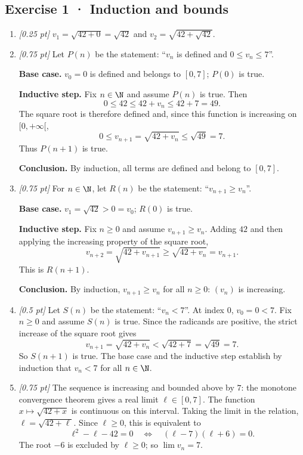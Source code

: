\subsection*{Exercise 1 · Induction and bounds}\begin{enumerate}

\item \textit{[0.25 pt]} $v_1=\sqrt{42+0}=\sqrt{42}$ and $v_2=\sqrt{42+\sqrt{42}}$.

\item \textit{[0.75 pt]} Let $P(n)$ be the statement: ``$v_n$ is defined and $0\le v_n\le 7$''.
\par\smallskip\textbf{Base case.} $v_0=0$ is defined and belongs to $[0,7]$; $P(0)$ is true.
\par\smallskip\textbf{Inductive step.} Fix $n\in\N$ and assume $P(n)$ is true. Then
\[0\le 42\le 42+v_n\le 42+7=49.\]
The square root is therefore defined and, since this function is increasing on $[0,+\infty[$,
\[0\le v_{n+1}=\sqrt{42+v_n}\le\sqrt{49}=7.\]
Thus $P(n+1)$ is true.
\par\smallskip\textbf{Conclusion.} By induction, all terms are defined and belong to $[0,7]$.

\item \textit{[0.75 pt]} For $n\in\N$, let $R(n)$ be the statement: ``$v_{n+1}\ge v_n$''.
\par\smallskip\textbf{Base case.} $v_1=\sqrt{42}>0=v_0$; $R(0)$ is true.
\par\smallskip\textbf{Inductive step.} Fix $n\ge0$ and assume $v_{n+1}\ge v_n$. Adding $42$ and then applying the increasing property of the square root,
\[v_{n+2}=\sqrt{42+v_{n+1}}\ge\sqrt{42+v_n}=v_{n+1}.\]
This is $R(n+1)$.
\par\smallskip\textbf{Conclusion.} By induction, $v_{n+1}\ge v_n$ for all $n\ge0$: $(v_n)$ is increasing.

\item \textit{[0.5 pt]} Let $S(n)$ be the statement: ``$v_n<7$''. At index $0$, $v_0=0<7$.
Fix $n\ge0$ and assume $S(n)$ is true. Since the radicands are positive, the strict increase of the square root gives
\[v_{n+1}=\sqrt{42+v_n}<\sqrt{42+7}=\sqrt{49}=7.\]
So $S(n+1)$ is true. The base case and the inductive step establish by induction that $v_n<7$ for all $n\in\N$.

\item \textit{[0.75 pt]} The sequence is increasing and bounded above by $7$: the monotone convergence theorem gives a real limit $\ell\in[0,7]$.
The function $x\mapsto\sqrt{42+x}$ is continuous on this interval. Taking the limit in the relation, $\ell=\sqrt{42+\ell}$. Since $\ell\ge0$, this is equivalent to
\[\ell^2-\ell-42=0\quad\Longleftrightarrow\quad(\ell-7)(\ell+6)=0.\]
The root $-6$ is excluded by $\ell\ge0$; so $\lim v_n=7$.


\end{enumerate}
